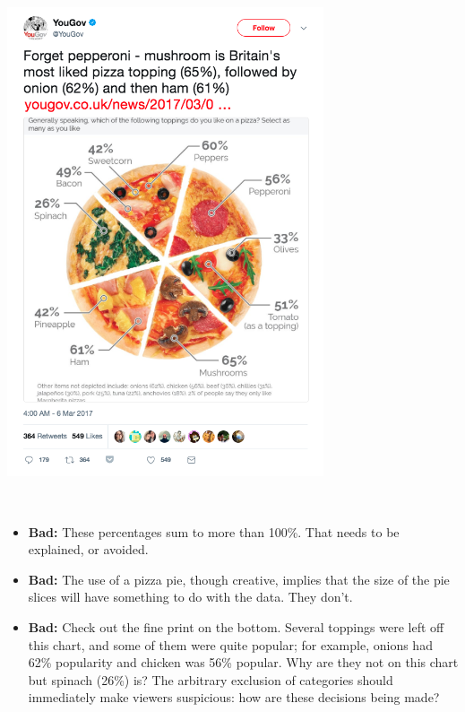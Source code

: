 \documentclass[]{book}
\providecommand{\tightlist}{%
  \setlength{\itemsep}{0pt}\setlength{\parskip}{0pt}}
\begin{document}
~\\

\includegraphics[width=0.7\textwidth,height=\textheight]{img/vis9.png}

~

\begin{itemize}
\tightlist
\item
  \textbf{Bad:} These percentages sum to more than 100\%. That needs to be explained, or avoided.\\
\item
  \textbf{Bad:} The use of a pizza pie, though creative, implies that the size of the pie slices will have something to do with the data. They don't.
\item
  \textbf{Bad:} Check out the fine print on the bottom. Several toppings were left off this chart, and some of them were quite popular; for example, onions had 62\% popularity and chicken was 56\% popular. Why are they not on this chart but spinach (26\%) is? The arbitrary exclusion of categories should immediately make viewers suspicious: how are these decisions being made?
\end{itemize}

~\\
\end{document}
